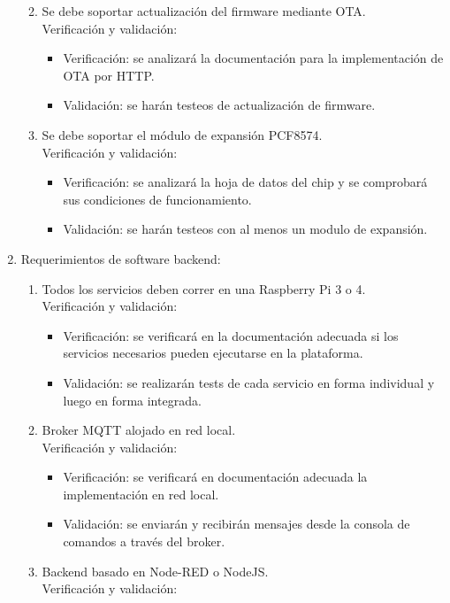 \documentclass[11pt]{charter}
\begin{document}
\begin{enumerate}
\begin{enumerate}
\begin{itemize}
		\end{itemize}
	\item Se debe soportar actualización del firmware mediante OTA.
		\\Verificación y validación:
		\begin{itemize}
		\item Verificación: se analizará la documentación para la implementación de OTA por HTTP.
		\item Validación: se harán testeos de actualización de firmware.
		\end{itemize}
	\item Se debe soportar el módulo de expansión PCF8574.
		\\Verificación y validación:
		\begin{itemize}
		\item Verificación: se analizará la hoja de datos del chip y se comprobará sus condiciones de funcionamiento.
		\item Validación: se harán testeos con al menos un modulo de expansión.
		\end{itemize}
	\end{enumerate}
\item Requerimientos de software backend:
	\begin{enumerate}
	\item Todos los servicios deben correr en una Raspberry Pi 3 o 4.
		\\Verificación y validación:
		\begin{itemize}
		\item Verificación: se verificará en la documentación adecuada si los servicios necesarios pueden ejecutarse en la plataforma.
		\item Validación: se realizarán tests de cada servicio en forma individual y luego en forma integrada.
		\end{itemize}
	\item Broker MQTT alojado en red local.
		\\Verificación y validación:
		\begin{itemize}
		\item Verificación: se verificará en documentación adecuada la implementación en red local.
		\item Validación: se enviarán y recibirán mensajes desde la consola de comandos a través del broker.
		\end{itemize}
	\item Backend basado en Node-RED o NodeJS.
		\\Verificación y validación:

\end{enumerate}
\end{enumerate}
\end{document}
